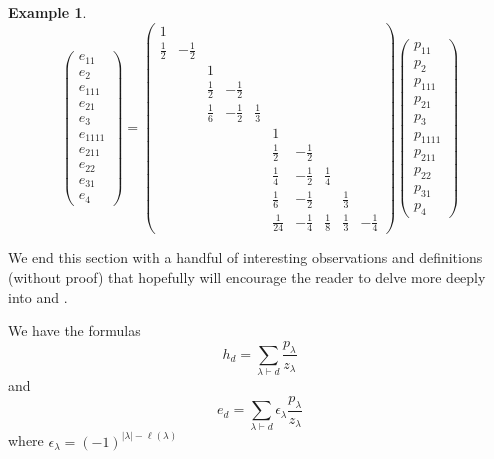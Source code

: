 \documentclass[12pt]{article}
\theoremstyle{plain}
\theoremstyle{definition}
\newtheorem{example}[theorem]{Example}
\theoremstyle{remark}
\numberwithin{equation}{section}
\begin{document}
\begin{example}
\[
\begin{pmatrix} e_{11}\\ e_2\\ e_{111}\\ e_{21}\\ e_3\\
e_{1111}\\ e_{211} \\ e_{22}\\ e_{31}\\ e_4
\end{pmatrix}
=
\begin{pmatrix}
1 & &
 & & &
& & & & \\
\frac{1}{2} & -\frac{1}{2} &
 & & &
& & & & \\
 & &
1 & & &
& & & & \\
 & &
\frac{1}{2} & -\frac{1}{2} &  &
& & & & \\
 & &
\frac{1}{6} & -\frac{1}{2} & \frac{1}{3} &
& & & & \\
 & &
 & & &
1 & & & & \\
 & &
 & & &
\frac{1}{2} & -\frac{1}{2} & & & \\
 & &
 & & &
\frac{1}{4} & -\frac{1}{2} & \frac{1}{4} & & \\
 & &
 & & &
\frac{1}{6} & -\frac{1}{2} & & \frac{1}{3} & \\
 & &
 & & &
\frac{1}{24} & -\frac{1}{4} & \frac{1}{8} & \frac{1}{3} & -\frac{1}{4}
\end{pmatrix} 
\begin{pmatrix}
p_{11}\\ p_2\\ p_{111}\\ p_{21}\\ p_3\\
p_{1111}\\ p_{211} \\ p_{22}\\ p_{31}\\ p_4
\end{pmatrix}
\]
\end{example}

We end this section with a handful of interesting observations and
definitions (without proof) that hopefully will encourage the reader to
delve more deeply into \cite{Macdonald} and \cite{Stanley2}.

We have the formulas
\[
h_d = \sum_{\lambda \vdash d} \frac{p_\lambda}{z_\lambda}\]
and
\[
e_d = \sum_{\lambda \vdash d} \epsilon_\lambda
\frac{p_\lambda}{z_\lambda}
\]
where $\epsilon_\lambda = (-1)^{|\lambda|-\ell(\lambda)}$
\end{document}
